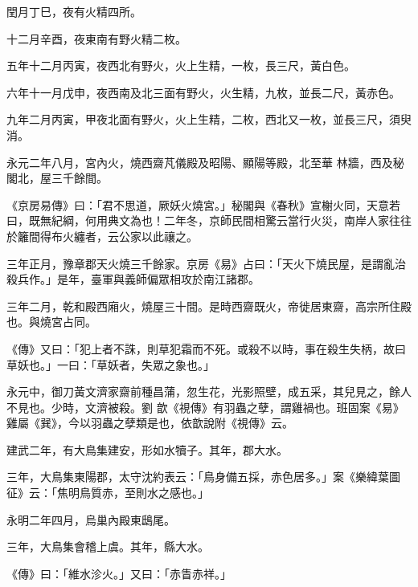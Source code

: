 \begin{pinyinscope}
 閏月丁巳，夜有火精四所。



 十二月辛酉，夜東南有野火精二枚。



 五年十二月丙寅，夜西北有野火，火上生精，一枚，長三尺，黃白色。



 六年十一月戊申，夜西南及北三面有野火，火生精，九枚，並長二尺，黃赤色。



 九年二月丙寅，甲夜北面有野火，火上生精，二枚，西北又一枚，並長三尺，須臾消。



 永元二年八月，宮內火，燒西齋芃儀殿及昭陽、顯陽等殿，北至華
 林牆，西及秘閣北，屋三千餘間。



 《京房易傳》曰：「君不思道，厥妖火燒宮。」秘閣與《春秋》宣榭火同，天意若曰，既無紀綱，何用典文為也！二年冬，京師民間相驚云當行火災，南岸人家往往於籬間得布火纏者，云公家以此禳之。



 三年正月，豫章郡天火燒三千餘家。京房《易》占曰：「天火下燒民屋，是謂亂治殺兵作。」是年，臺軍與義師偏眾相攻於南江諸郡。



 三年二月，乾和殿西廂火，燒屋三十間。是時西齋既火，帝徙居東齋，高宗所住殿也。與燒宮占同。



 《傳》又曰：「犯上者不誅，則草犯霜而不死。或殺不以時，事在殺生失柄，故曰草妖也。」一曰：「草妖者，失眾之象也。」



 永元中，御刀黃文濟家齋前種昌蒲，忽生花，光影照壁，成五采，其兒見之，餘人不見也。少時，文濟被殺。劉
 歆《視傳》有羽蟲之孽，謂雞禍也。班固案《易》雞屬《巽》，今以羽蟲之孽類是也，依歆說附《視傳》云。



 建武二年，有大鳥集建安，形如水犢子。其年，郡大水。



 三年，大鳥集東陽郡，太守沈約表云：「鳥身備五採，赤色居多。」案《樂緯葉圖征》云：「焦明鳥質赤，至則水之感也。」



 永明二年四月，烏巢內殿東鴟尾。



 三年，大鳥集會稽上虞。其年，縣大水。



 《傳》曰：「維水沴火。」又曰：「赤眚赤祥。」




\end{pinyinscope}
